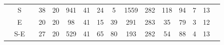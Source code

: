 \documentclass[12pt,bibliography=oldstyle,DIV=12,parskip=half-]{scrreprt}
\begin{document}
\begin{table}[h]
\begin{tabular}{@{}ccc@{}SSSSSSSSSSSSS@{}}
    \midrule
&{S}  &&  38 & 20&  941 &    41 &    24 &     5 &  1559 &   282 &   118 &    94 &     7 &    13 \\
&{E}  &&  20 & 20&   98 &    41 &    15 &    39 &   291 &   283 &    35 &    79 &     3 &    12 \\
&{S-E}&&  27 & 20&  529 &    41 &    65 &    80 &   193 &   282 &    54 &    88 &     4 &    13 \\

\end{tabular}
\end{table}
\end{document}
